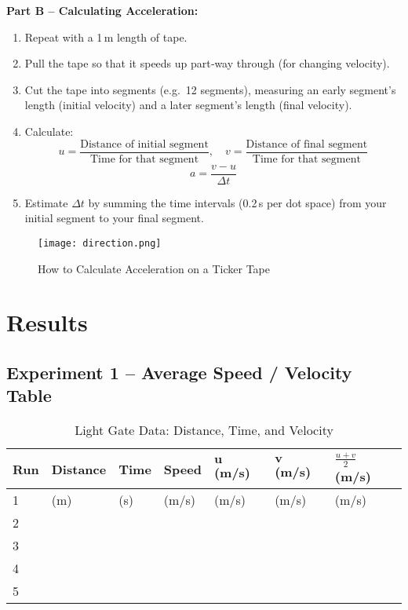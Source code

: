 \documentclass{tufte-handout}
\begin{document}
\noindent\textbf{Part B -- Calculating Acceleration:}
\begin{enumerate}
  \item Repeat with a 1\,m length of tape.
  \item Pull the tape so that it speeds up part‐way through (for changing velocity).
  \item Cut the tape into segments (e.g.\ 12 segments), measuring an early segment’s length (initial velocity) and a later segment’s length (final velocity).
  \item Calculate:
  \[
    u = \frac{\text{Distance of initial segment}}{\text{Time for that segment}},
    \quad
    v = \frac{\text{Distance of final segment}}{\text{Time for that segment}}
  \]
  \[
    a = \frac{v - u}{\Delta t}
  \]
  \item Estimate $\Delta t$ by summing the time intervals (0.2\,s per dot space) from your initial segment to your final segment.

\end{enumerate}
\begin{figure}
    \centering
    \texttt{[image: direction.png]}
    \caption{How to Calculate Acceleration on a Ticker Tape}
    \label{fig:enter-label}
\end{figure}

\section{Results}

\subsection{Experiment 1 -- Average Speed / Velocity Table}
\FloatBarrier
\begin{table}[ht]
\centering
\caption{Light Gate Data: Distance, Time, and Velocity}
\begin{tabular}{@{}lllllll@{}}
\toprule
\textbf{Run} &
\textbf{Distance} &
\textbf{Time} &
\textbf{Speed} &
$\boldsymbol{u}$ (\si{m/s}) &
$\boldsymbol{v}$ (\si{m/s}) &
$\frac{u + v}{2}$ (\si{m/s}) \\
\midrule
1 & (m) & (s) & (m/s) & (m/s) & (m/s) & (m/s) \\
2 &  &  &  &  &  &  \\
3 &  &  &  &  &  &  \\
4 &  &  &  &  &  &  \\
5 &  &  &  &  &  &  \\
\bottomrule
\end{tabular}
\end{table}
\end{document}
